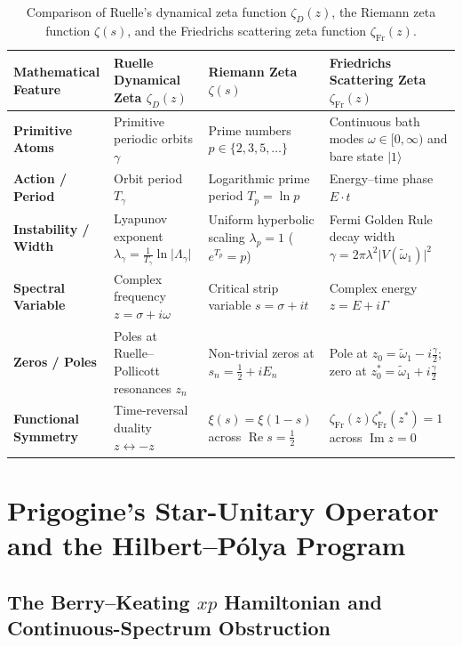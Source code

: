 \documentclass[11pt,a4paper]{article}
\newcommand{\Real}{\operatorname{Re}}
\newcommand{\Imag}{\operatorname{Im}}
\begin{document}
\begin{table}[htbp]
\centering
\caption{Comparison of Ruelle's dynamical zeta function $\zeta_D(z)$, the Riemann zeta function $\zeta(s)$, and the Friedrichs scattering zeta function $\zeta_{\mathrm{Fr}}(z)$.}
\label{tab:zeta_comparison}
\renewcommand{\arraystretch}{1.35}
\begin{tabular}{@{} >{\bfseries}p{2.9cm} p{3.9cm} p{3.9cm} p{3.9cm} @{}}
\toprule
Mathematical Feature & Ruelle Dynamical Zeta $\zeta_D(z)$ & Riemann Zeta $\zeta(s)$ & Friedrichs Scattering Zeta $\zeta_{\mathrm{Fr}}(z)$ \\
\midrule
Primitive Atoms & Primitive periodic orbits $\gamma$ & Prime numbers $p \in \{2,3,5,\dots\}$ & Continuous bath modes $\omega \in [0,\infty)$ and bare state $\lvert 1\rangle$ \\
Action / Period & Orbit period $T_\gamma$ & Logarithmic prime period $T_p = \ln p$ & Energy--time phase $E \cdot t$ \\
Instability / Width & Lyapunov exponent $\lambda_\gamma = \frac{1}{T_\gamma}\ln\lvert \Lambda_\gamma\rvert$ & Uniform hyperbolic scaling $\lambda_p = 1$ ($e^{T_p} = p$) & Fermi Golden Rule decay width $\gamma = 2\pi\lambda^2\lvert V(\tilde{\omega}_1)\rvert^2$ \\
Spectral Variable & Complex frequency $z = \sigma + i\omega$ & Critical strip variable $s = \sigma + it$ & Complex energy $z = E + i\Gamma$ \\
Zeros / Poles & Poles at Ruelle--Pollicott resonances $z_n$ & Non-trivial zeros at $s_n = \frac{1}{2} + iE_n$ & Pole at $z_0 = \tilde{\omega}_1 - i\frac{\gamma}{2}$; zero at $z_0^* = \tilde{\omega}_1 + i\frac{\gamma}{2}$ \\
Functional Symmetry & Time-reversal duality $z \leftrightarrow -z$ & $\xi(s) = \xi(1-s)$ across $\Real s = \frac{1}{2}$ & $\zeta_{\mathrm{Fr}}(z)\zeta_{\mathrm{Fr}}^*(z^*) = 1$ across $\Imag z = 0$ \\
\bottomrule
\end{tabular}
\end{table}

\section{Prigogine's Star-Unitary Operator and the Hilbert--P\'olya Program}

\subsection{The Berry--Keating $xp$ Hamiltonian and Continuous-Spectrum Obstruction}
\end{document}
